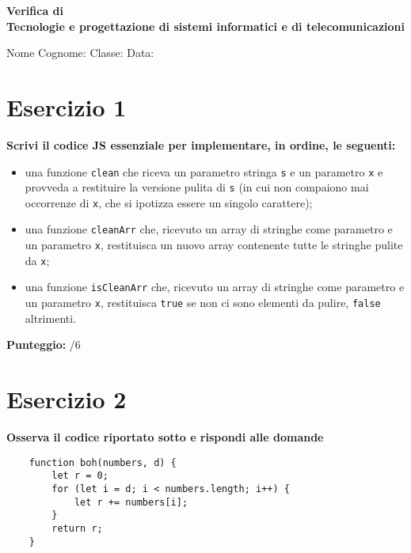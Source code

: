 \documentclass{article}
\begin{document}
\begin{center}
\textbf{\Large Verifica di \\ Tecnologie e progettazione di sistemi informatici e di telecomunicazioni}
\end{center}

\begin{flushleft}
Nome Cognome: \underline{\hspace{5cm}} \quad Classe: \underline{\hspace{3cm}} \quad Data: \underline{\hspace{3cm}}
\end{flushleft}

\section*{Esercizio 1}

\textbf{Scrivi il codice JS essenziale per implementare, in ordine, le seguenti:}

\begin{itemize}
    \item una funzione \texttt{clean} che riceva un parametro stringa \texttt{s} e un parametro \texttt{x} e provveda a restituire la versione pulita di \texttt{s} (in cui non compaiono mai occorrenze di \texttt{x}, che si ipotizza essere un singolo carattere);
    \item una funzione \texttt{cleanArr} che, ricevuto un array di stringhe come parametro e un parametro \texttt{x}, restituisca un nuovo array contenente tutte le stringhe pulite da \texttt{x};
    \item una funzione \texttt{isCleanArr} che, ricevuto un array di stringhe come parametro e un parametro \texttt{x}, restituisca \texttt{true} se non ci sono elementi da pulire, \texttt{false} altrimenti.
\end{itemize}

\begin{flushright}\textbf{Punteggio:} \underline{\hspace{1cm}}/6\end{flushright}


\section*{Esercizio 2}

\textbf{Osserva il codice riportato sotto e rispondi alle domande}

\begin{lstlisting}
    function boh(numbers, d) {
        let r = 0;
        for (let i = d; i < numbers.length; i++) {
            let r += numbers[i];
        }
        return r;
    }
\end{lstlisting}
\end{document}
